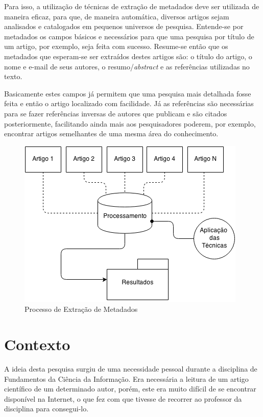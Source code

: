 Para isso, a utilização de técnicas de extração de metadados deve ser utilizada de maneira eficaz, para que, de maneira automática, diversos artigos sejam analisados e catalogados em pequenos universos de pesquisa. Entende-se por metadados os campos básicos e necessários para que uma pesquisa por título de um artigo, por exemplo, seja feita com sucesso. Resume-se então que os metadados que esperam-se ser extraídos destes artigos são: o título do artigo, o nome e e-mail de seus autores, o resumo/\textit{abstract} e as referências utilizadas no texto.

Basicamente estes campos já permitem que uma pesquisa mais detalhada fosse feita e então o artigo localizado com facilidade. Já as referências são necessárias para se fazer referências inversas de autores que publicam e são citados posteriormente, facilitando ainda mais aos pesquisadores poderem, por exemplo, encontrar artigos semelhantes de uma mesma área do conhecimento.

\begin{figure}
	\centering
	\caption{Processo de Extração de Metadados}
	\label{fig:introduction}
	\includegraphics[width=0.7\linewidth]{./assets/images/introduction}
\end{figure}

\section{Contexto}
\label{sec:context}

A ideia desta pesquisa surgiu de uma necessidade pessoal durante a disciplina de Fundamentos da Ciência da Informação. Era necessária a leitura de um artigo científico de um determinado autor, porém, este era muito difícil de se encontrar disponível na Internet, o que fez com que tivesse de recorrer ao professor da disciplina para consegui-lo.

